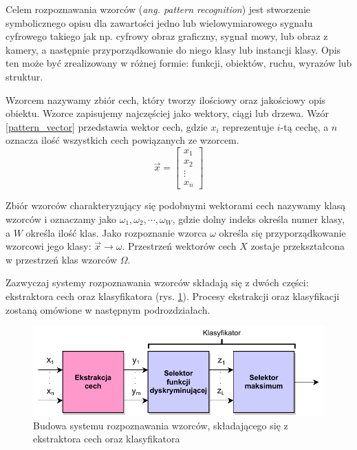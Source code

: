 
Celem rozpoznawania wzorców (\emph{ang. pattern recognition}) jest stworzenie symbolicznego opisu dla zawartości jedno lub wielowymiarowego sygnału cyfrowego takiego jak np. cyfrowy obraz graficzny, sygnał mowy, lub obraz z kamery, a następnie przyporządkowanie do niego klasy lub instancji klasy. Opis ten może być zrealizowany w różnej formie: funkcji, obiektów, ruchu, wyrazów lub struktur.

Wzorcem nazywamy zbiór cech, który tworzy ilościowy oraz jakościowy opis obiektu. Wzorce zapisujemy najczęściej jako wektory, ciągi lub drzewa. Wzór \ref{pattern_vector} przedstawia wektor cech, gdzie $x_{i}$ reprezentuje $i$-tą cechę, a $n$ oznacza ilość wszystkich cech powiązanych ze wzorcem.\cite{GONZALES01}
\begin{equation} 
\label{pattern_vector} 
\overrightarrow{x}=
\begin{bmatrix}x_1\\
x_2\\
\vdots\\
x_n  
\end{bmatrix}
\end{equation}

Zbiór wzorców charakteryzujący się podobnymi wektorami cech nazywamy klasą wzorców i oznaczamy jako $\omega_1, \omega_2, \cdots, \omega_{W}$, gdzie dolny indeks określa numer klasy, a $W$ określa ilość klas. Jako rozpoznanie wzorca $\omega$ określa się przyporządkowanie wzorcowi jego klasy: $\overrightarrow{x} \rightarrow \omega$. Przestrzeń wektorów cech $X$ zostaje przekształcona w przestrzeń klas wzorców $\Omega$.

Zazwyczaj systemy rozpoznawania wzorców składają się z dwóch części: ekstraktora cech oraz klasyfikatora (rys. \ref{fig:pattern-recongnition}). Procesy ekstrakcji oraz klasyfikacji zostaną omówione w następnym podrozdziałach.

\begin{figure}[h]
	\centering
	\includegraphics[scale=1.0]{graphics/01_podstawy_teoretyczne/pattern-recongnition}
	\caption{ Budowa systemu rozpoznawania wzorców, składającego się z ekstraktora cech oraz klasyfikatora \cite{FUKUNAGA90} }
	\label{fig:pattern-recongnition}
\end{figure}

